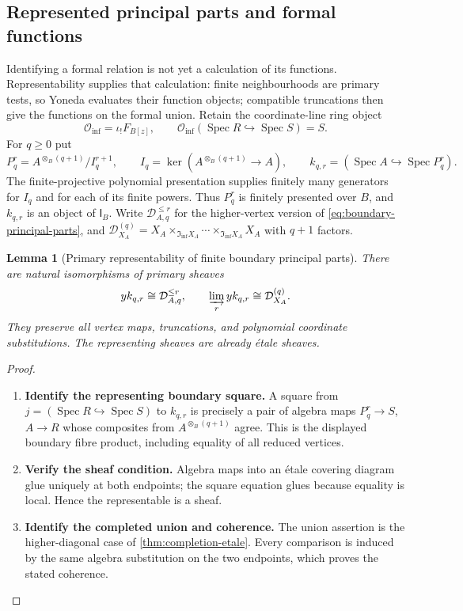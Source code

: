 \documentclass[11pt,a4paper]{article}
\numberwithin{algorithm}{section}
\numberwithin{equation}{section}
\newtheorem{lemma}[lemma]{Lemma}
\theoremstyle{definition}
\theoremstyle{remark}
\theoremstyle{plain}
\newcommand{\InfShape}{\mathfrak I_{\mathrm{inf}}}
\newcommand{\InfB}{\mathsf I_B}
\theoremstyle{definition}
\theoremstyle{plain}
\begin{document}
\subsection{Represented principal parts and formal functions}
\label{sec:primary-formal-functions}
Identifying a formal relation is not yet a calculation of its
functions. Representability supplies that calculation: finite
neighbourhoods are primary tests, so Yoneda evaluates their function
objects; compatible truncations then give the functions on the
formal union. Retain the coordinate-line ring object
\[
 \mathcal O_{\mathrm{inf}}=\iota_!F_{B[z]},\qquad
 \mathcal O_{\mathrm{inf}}(\operatorname{Spec}R\hookrightarrow
                         \operatorname{Spec}S)=S.
\]
For $q\ge0$ put
\[
 P_q^r=A^{\otimes_B(q+1)}/I_q^{r+1},\qquad
 I_q=\ker(A^{\otimes_B(q+1)}\to A),\qquad
 k_{q,r}=(\operatorname{Spec}A\hookrightarrow\operatorname{Spec}P_q^r).
\]
The finite-projective polynomial presentation supplies finitely many
generators for $I_q$ and for each of its finite powers.  Thus $P_q^r$
is finitely presented over $B$, and $k_{q,r}$ is an object
of $\InfB$.  Write $\mathcal D_{A,q}^{\le r}$ for the higher-vertex
version of \eqref{eq:boundary-principal-parts}, and
$\mathcal D_{X_A}^{(q)}=X_A\times_{\InfShape X_A}\cdots
\times_{\InfShape X_A}X_A$ with $q+1$ factors.

\begin{lemma}[Primary representability of finite boundary principal parts]
\label{lem:primary-principal-representability}
There are natural isomorphisms of primary sheaves
\[
 yk_{q,r}\cong\mathcal D_{A,q}^{\le r},\qquad
 \varinjlim_r yk_{q,r}\cong\mathcal D_{X_A}^{(q)}.
\]
They preserve all vertex maps, truncations, and polynomial coordinate
substitutions.  The representing sheaves are already \'etale sheaves.
\end{lemma}
\begin{proof}\leavevmode
\begin{enumerate}[leftmargin=*,align=left]
\item \textbf{Identify the representing boundary square.}
A square from $j=(\operatorname{Spec}R\hookrightarrow\operatorname{Spec}S)$
to $k_{q,r}$ is precisely a pair of algebra maps
$P_q^r\to S$, $A\to R$ whose composites from
$A^{\otimes_B(q+1)}$ agree.  This is the displayed boundary
fibre product, including equality of all reduced vertices.

\item \textbf{Verify the sheaf condition.}
Algebra
maps into an \'etale covering diagram glue uniquely at both endpoints;
the square equation glues because equality is local.  Hence the
representable is a sheaf.

\item \textbf{Identify the completed union and coherence.}
The union assertion is the higher-diagonal
case of \cref{thm:completion-etale}.  Every comparison is induced by
the same algebra substitution on the two endpoints, which proves
the stated coherence.
\end{enumerate}
\end{proof}
\end{document}
